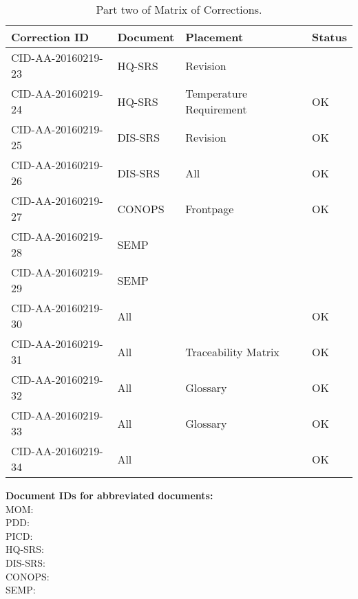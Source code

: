 \begin{table}[ht]
\centering
\begin{tabular}{|>{\centering\arraybackslash}p{4.5cm}|>{\centering\arraybackslash}p{2cm}|>{\centering\arraybackslash}p{3cm}|>{\centering\arraybackslash}p{3cm}|}
\hline \textbf{Correction ID} & \textbf{Document} & \textbf{Placement} & \textbf{Status} \\ 
\hline CID-AA-20160219-23 & HQ-SRS & Revision & \\ 
\hline CID-AA-20160219-24 & HQ-SRS & Temperature Requirement & OK \\ 
\hline CID-AA-20160219-25 & DIS-SRS & Revision & OK\\ 
\hline CID-AA-20160219-26 & DIS-SRS & All & OK \\ 
\hline CID-AA-20160219-27 & CONOPS & Frontpage & OK \\ 
\hline CID-AA-20160219-28 & SEMP &  & \\ 
\hline CID-AA-20160219-29 & SEMP &  & \\ 
\hline CID-AA-20160219-30 & All &  & OK\\ 
\hline CID-AA-20160219-31 & All & Traceability Matrix & OK\\ 
\hline CID-AA-20160219-32 & All & Glossary & OK\\ 
\hline CID-AA-20160219-33 & All & Glossary & OK\\ 
\hline CID-AA-20160219-34 & All &  & OK\\
\hline 
\end{tabular}
\caption{Part two of Matrix of Corrections.}
\label{tb:MoC2} 
\end{table}

\vspace{20pt}
\noindent \textbf{Document IDs for abbreviated documents:}\\
MOM:        \mom \\
PDD:        \pdd \\
PICD:       \picd \\
HQ-SRS:     \srshq \\
DIS-SRS:    \srsdis \\
CONOPS:     \conops \\
SEMP:       \semp \\

